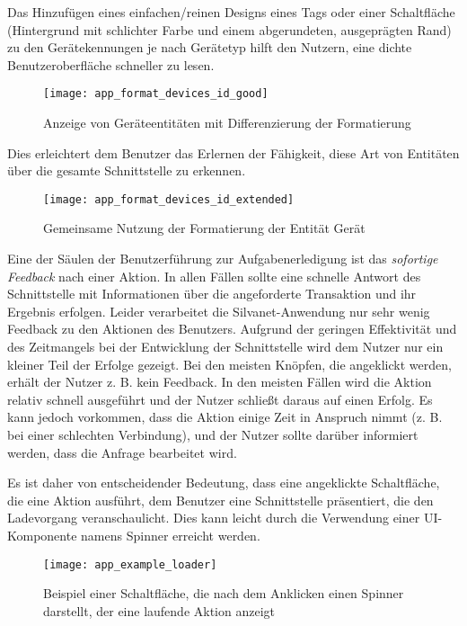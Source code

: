 Das Hinzufügen eines einfachen/reinen Designs eines Tags oder einer Schaltfläche (Hintergrund mit schlichter Farbe und einem abgerundeten, ausgeprägten Rand) zu den Gerätekennungen je nach Gerätetyp hilft den Nutzern, eine dichte Benutzeroberfläche schneller zu lesen.

\begin{figure}[H]
  \centering
  \texttt{[image: app\_format\_devices\_id\_good]}
  \caption{Anzeige von Geräteentitäten mit Differenzierung der Formatierung}
  \label{fig:app_format_devices_id_good}
\end{figure}

Dies erleichtert dem Benutzer das Erlernen der Fähigkeit, diese Art von Entitäten über die gesamte Schnittstelle zu erkennen.

\begin{figure}[H]
  \centering
  \texttt{[image: app\_format\_devices\_id\_extended]}
  \caption{Gemeinsame Nutzung der Formatierung der Entität Gerät}
  \label{fig:app_format_devices_id_extended}
\end{figure}

Eine der Säulen der Benutzerführung zur Aufgabenerledigung ist das \textit{sofortige Feedback} nach einer Aktion.
In allen Fällen sollte eine schnelle Antwort des Schnittstelle mit Informationen über die angeforderte Transaktion und ihr Ergebnis erfolgen.
Leider verarbeitet die Silvanet-Anwendung nur sehr wenig Feedback zu den Aktionen des Benutzers.
Aufgrund der geringen Effektivität und des Zeitmangels bei der Entwicklung der Schnittstelle wird dem Nutzer nur ein kleiner Teil der Erfolge gezeigt.
Bei den meisten Knöpfen, die angeklickt werden, erhält der Nutzer z. B. kein Feedback. In den meisten Fällen wird die Aktion relativ schnell ausgeführt und der Nutzer schließt daraus auf einen Erfolg.
Es kann jedoch vorkommen, dass die Aktion einige Zeit in Anspruch nimmt (z. B. bei einer schlechten Verbindung), und der Nutzer sollte darüber informiert werden, dass die Anfrage bearbeitet wird.

Es ist daher von entscheidender Bedeutung, dass eine angeklickte Schaltfläche, die eine Aktion ausführt, dem Benutzer eine Schnittstelle präsentiert, die den Ladevorgang veranschaulicht.
Dies kann leicht durch die Verwendung einer \ac{UI}-Komponente namens Spinner erreicht werden.

\begin{figure}[H]
  \centering
  \texttt{[image: app\_example\_loader]}
  \caption{Beispiel einer Schaltfläche, die nach dem Anklicken einen Spinner darstellt, der eine laufende Aktion anzeigt}
  \label{fig:app_example_loader}
\end{figure}

